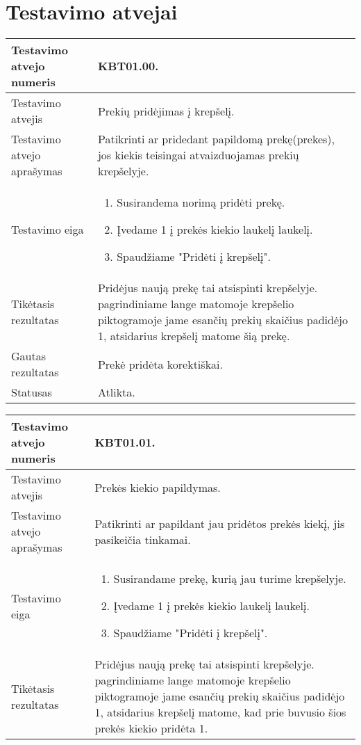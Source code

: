 \documentclass{VUMIFPSkursinis}
\begin{document}
\section{Testavimo atvejai}
\begin{center}
	\begin{tabular}{ |p{5cm}|p{10cm}|}
	\hline
	Testavimo atvejo numeris & KBT01.00. \\ \hline
	Testavimo atvejis &  Prekių pridėjimas į krepšelį.\\ \hline
	Testavimo atvejo aprašymas & Patikrinti ar pridedant papildomą prekę(prekes), jos kiekis teisingai atvaizduojamas prekių krepšelyje.  \\ \hline
	Testavimo eiga & 
	\begin{enumerate} 
		\item Susirandema norimą pridėti prekę.
		\item Įvedame 1 į prekės kiekio laukelį laukelį.
		\item Spaudžiame "Pridėti į krepšelį".
	\end{enumerate} \\ \hline
	Tikėtasis rezultatas & Pridėjus naują prekę tai atsispinti krepšelyje. pagrindiniame lange matomoje krepšelio piktogramoje jame esančių prekių skaičius padidėjo 1, atsidarius krepšelį matome šią prekę.  \\ \hline
	Gautas rezultatas & Prekė pridėta korektiškai. \\ \hline
	Statusas & Atlikta. \\ \hline
	\end{tabular}
\vspace{1cm}
\begin{tabular}{ |p{5cm}|p{10cm}|}
	\hline
	Testavimo atvejo numeris & KBT01.01. \\ \hline
	Testavimo atvejis & Prekės kiekio papildymas. \\ \hline
	Testavimo atvejo aprašymas & Patikrinti ar papildant jau pridėtos prekės kiekį, jis pasikeičia tinkamai. \\ \hline
	Testavimo eiga & 
	\begin{enumerate} 
		\item Susirandame prekę, kurią jau turime krepšelyje.
		\item Įvedame 1 į prekės kiekio laukelį laukelį.
		\item Spaudžiame "Pridėti į krepšelį".
	\end{enumerate} \\ \hline
	Tikėtasis rezultatas & Pridėjus naują prekę tai atsispinti krepšelyje. pagrindiniame lange matomoje krepšelio piktogramoje jame esančių prekių skaičius padidėjo 1, atsidarius krepšelį matome, kad prie buvusio šios prekės kiekio pridėta 1. \\ \hline

\end{tabular}
\end{center}
\end{document}
